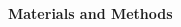 \documentclass[11pt]{article}
\begin{document}
\begin{multicols}{2}
    \vspace{20pt}

     \selectfont \textbf{Materials and Methods}
    
     \selectfont 


    


\end{multicols}
\end{document}
